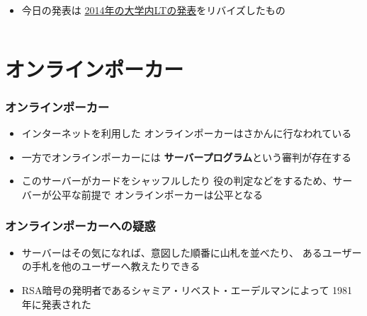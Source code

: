 \begin{frame}
\begin{columns}
\begin{column}{0.6\textwidth}
\begin{itemize}
        \item<+-> 今日の発表は
        \href{https://atnd.org/events/51236}{2014年の大学内LTの発表}をリバイズしたもの
      \end{itemize}
    \end{column}
  \end{columns}
\end{frame}

\section{オンラインポーカー}

\begin{frame}
  \frametitle{オンラインポーカー}

  \pause
  \begin{itemize}
    \item<+-> インターネットを利用した
    オンラインポーカーはさかんに行なわれている

    \item<+-> 一方でオンラインポーカーには
    \textbf{サーバープログラム}という審判が存在する

    \item<+-> このサーバーがカードをシャッフルしたり
    役の判定などをするため、サーバーが公平な前提で
    オンラインポーカーは公平となる
  \end{itemize}
\end{frame}

\begin{frame}
  \frametitle{オンラインポーカーへの疑惑}
  

  \pause
  \begin{itemize}
    \item<+-> サーバーはその気になれば、意図した順番に山札を並べたり、
    あるユーザーの手札を他のユーザーへ教えたりできる
  \end{itemize}
  


  \begin{itemize}
    \item<+-> RSA暗号の発明者であるシャミア・リベスト・エーデルマンによって
    1981年に発表された\cite{Shamir1981}
  \end{itemize}

\end{frame}

